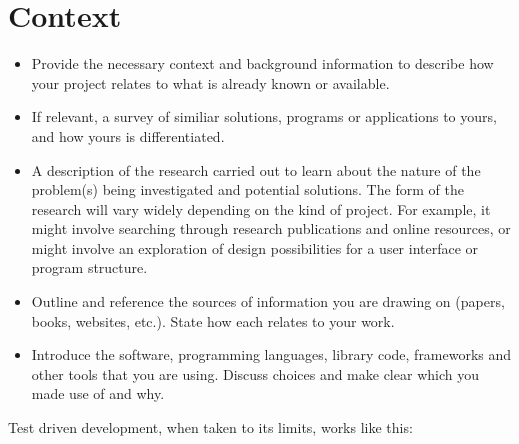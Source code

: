 \section{Context}
\label{sec:context}

\begin{itemize}
	\item Provide the necessary context and background information to describe how your project relates to what is already known or available.
	\item If relevant, a survey of similiar solutions, programs or applications to yours, and how yours is differentiated.
	\item A description of the research carried out to learn about the nature of the problem(s) being investigated and potential solutions. The form of the research will vary widely depending on the kind of project. For example, it might involve searching through research publications and online resources, or might involve an exploration of design possibilities for a user interface or program structure.
	\item Outline and reference the sources of information you are drawing on (papers, books, websites, etc.). State how each relates to your work.
	\item Introduce the software, programming languages, library code, frameworks and other tools that you are using. Discuss choices and make clear which you made use of and why.
\end{itemize}

Test driven development, when taken to its limits, works like this:


